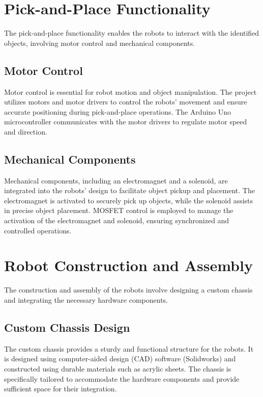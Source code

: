 \documentclass[a4paper,12pt,oneside]{book}
\begin{document}
\section{Pick-and-Place Functionality}
The pick-and-place functionality enables the robots to interact with the identified objects, involving motor control and mechanical components.

\subsection{Motor Control}
Motor control is essential for robot motion and object manipulation. The project utilizes motors and motor drivers to control the robots' movement and ensure accurate positioning during pick-and-place operations. The Arduino Uno microcontroller communicates with the motor drivers to regulate motor speed and direction.

\subsection{Mechanical Components}
Mechanical components, including an electromagnet and a solenoid, are integrated into the robots' design to facilitate object pickup and placement. The electromagnet is activated to securely pick up objects, while the solenoid assists in precise object placement. MOSFET control is employed to manage the activation of the electromagnet and solenoid, ensuring synchronized and controlled operations.
\newpage
\section{Robot Construction and Assembly}
The construction and assembly of the robots involve designing a custom chassis and integrating the necessary hardware components.

\subsection{Custom Chassis Design}
The custom chassis provides a sturdy and functional structure for the robots. It is designed using computer-aided design (CAD) software (Solidworks) and constructed using durable materials such as acrylic sheets. The chassis is specifically tailored to accommodate the hardware components and provide sufficient space for their integration.
\end{document}
